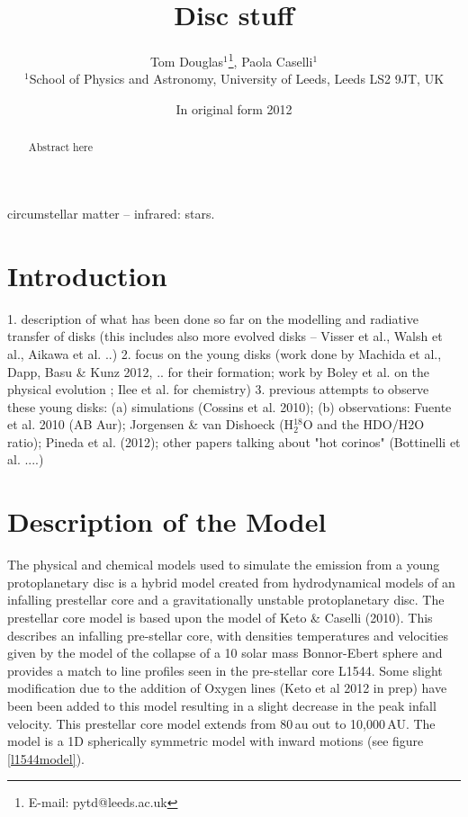 \documentclass[useAMS,usenatbib]{mn2e}
\title[Disc stuff]{Disc stuff}
\author[Tom  Douglas, Paola Caselli, Et al.]{Tom Douglas$^{1}$\thanks{E-mail:
pytd@leeds.ac.uk}, Paola Caselli$^{1}$\\
$^{1}$School of Physics and Astronomy, University of Leeds, Leeds LS2 9JT, UK}
\begin{document}
\date{In original form 2012}

\pagerange{\pageref{firstpage}--\pageref{lastpage}} 

\maketitle

\label{firstpage}

\begin{abstract}
Abstract here
\end{abstract}

\begin{keywords}
circumstellar matter -- infrared: stars.
\end{keywords}

\section{Introduction}

1. description of what has been done so far on the modelling and radiative transfer of disks (this includes also more evolved disks -- Visser et al., Walsh et al., Aikawa et al. ..)
2. focus on the young disks (work done by Machida et al., Dapp, Basu \& Kunz 2012, .. for their formation; work by Boley et al. on the physical evolution ; Ilee et al. for chemistry) 
3. previous attempts to observe these young disks: (a) simulations (Cossins et al. 2010); (b) observations: Fuente et al. 2010 (AB Aur); Jorgensen \& van Dishoeck (H$_2^{18}$O and the HDO/H2O ratio); Pineda et al. (2012); other papers talking about "hot corinos" (Bottinelli et al. ....)

\section{Description of the Model}

The physical and chemical models used to simulate the emission from a young protoplanetary disc is a hybrid model created from hydrodynamical models of an infalling prestellar core and a gravitationally unstable protoplanetary disc. The prestellar core model is based upon the model of Keto \& Caselli (2010). This describes an infalling pre-stellar core, with densities temperatures and velocities given by the model of the collapse of a 10 solar mass Bonnor-Ebert sphere and provides a match to line profiles seen in the pre-stellar core L1544. Some slight modification due to the addition of Oxygen lines (Keto et al 2012 in prep) have been been added to this model resulting in a slight decrease in the peak infall velocity. This prestellar core model extends from 80$\,$au out to 10,000$\,$AU. The model is a 1D spherically symmetric model with inward motions (see figure \ref{l1544model}).\newline
\end{document}

